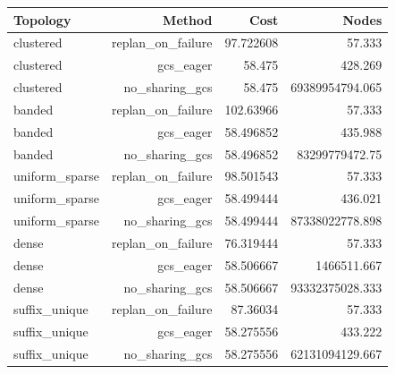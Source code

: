 \begin{tabular}{lrrr}
\toprule
Topology & Method & Cost & Nodes \\
\midrule
clustered & replan\_on\_failure & 97.722608 & 57.333 \\
clustered & gcs\_eager & 58.475 & 428.269 \\
clustered & no\_sharing\_gcs & 58.475 & 69389954794.065 \\
banded & replan\_on\_failure & 102.63966 & 57.333 \\
banded & gcs\_eager & 58.496852 & 435.988 \\
banded & no\_sharing\_gcs & 58.496852 & 83299779472.75 \\
uniform\_sparse & replan\_on\_failure & 98.501543 & 57.333 \\
uniform\_sparse & gcs\_eager & 58.499444 & 436.021 \\
uniform\_sparse & no\_sharing\_gcs & 58.499444 & 87338022778.898 \\
dense & replan\_on\_failure & 76.319444 & 57.333 \\
dense & gcs\_eager & 58.506667 & 1466511.667 \\
dense & no\_sharing\_gcs & 58.506667 & 93332375028.333 \\
suffix\_unique & replan\_on\_failure & 87.36034 & 57.333 \\
suffix\_unique & gcs\_eager & 58.275556 & 433.222 \\
suffix\_unique & no\_sharing\_gcs & 58.275556 & 62131094129.667 \\
\bottomrule
\end{tabular}
